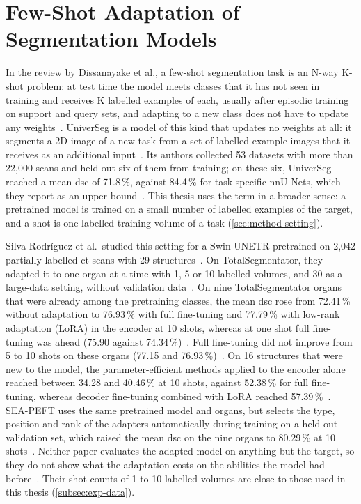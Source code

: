 \section{Few-Shot Adaptation of Segmentation Models}
\label{sec:sota-few-shot}

In the review by Dissanayake et al., a few-shot segmentation task is an N-way K-shot problem: at test time the model meets classes that it has not seen in training and receives K labelled examples of each, usually after episodic training on support and query sets, and adapting to a new class does not have to update any weights~\cite[Sec.~2.2.1]{theekshana26fewshot}.
UniverSeg is a model of this kind that updates no weights at all: it segments a 2D image of a new task from a set of labelled example images that it receives as an additional input~\cite{universeg}.
Its authors collected 53 datasets with more than 22{,}000 scans and held out six of them from training; on these six, UniverSeg reached a mean \gls{dsc} of 71.8\,\%, against 84.4\,\% for task-specific nnU-Nets, which they report as an upper bound~\cite{universeg}.
This thesis uses the term in a broader sense: a pretrained model is trained on a small number of labelled examples of the target, and a shot is one labelled training volume of a task (\cref{sec:method-setting}).

Silva-Rodríguez et al.\ studied this setting for a Swin UNETR pretrained on 2{,}042 partially labelled \gls{ct} scans with 29 structures~\cite{silvarodriguez2023fseft}.
On TotalSegmentator, they adapted it to one organ at a time with 1, 5 or 10 labelled volumes, and 30 as a large-data setting, without validation data~\cite{silvarodriguez2023fseft}.
On nine TotalSegmentator organs that were already among the pretraining classes, the mean \gls{dsc} rose from 72.41\,\% without adaptation to 76.93\,\% with full fine-tuning and 77.79\,\% with low-rank adaptation (LoRA) in the encoder at 10 shots, whereas at one shot full fine-tuning was ahead (75.90 against 74.34\,\%)~\cite{silvarodriguez2023fseft}.
Full fine-tuning did not improve from 5 to 10 shots on these organs (77.15 and 76.93\,\%)~\cite{silvarodriguez2023fseft}.
On 16 structures that were new to the model, the parameter-efficient methods applied to the encoder alone reached between 34.28 and 40.46\,\% at 10 shots, against 52.38\,\% for full fine-tuning, whereas decoder fine-tuning combined with LoRA reached 57.39\,\%~\cite{silvarodriguez2023fseft}.
SEA-PEFT uses the same pretrained model and organs, but selects the type, position and rank of the adapters automatically during training on a held-out validation set, which raised the mean \gls{dsc} on the nine organs to 80.29\,\% at 10 shots~\cite{ly2026seapeft}.
Neither paper evaluates the adapted model on anything but the target, so they do not show what the adaptation costs on the abilities the model had before~\cite{silvarodriguez2023fseft,ly2026seapeft}.
Their shot counts of 1 to 10 labelled volumes are close to those used in this thesis (\cref{subsec:exp-data}).

